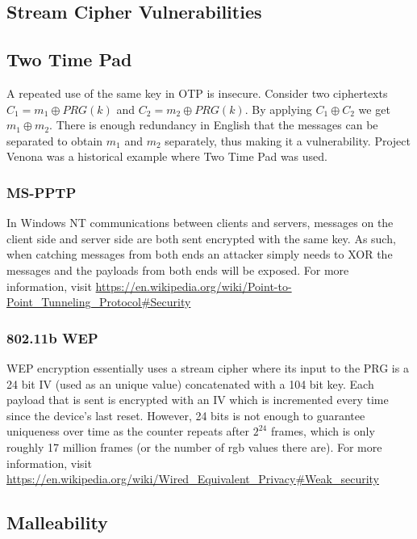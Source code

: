 \documentclass{article}
\begin{document}
\begin{multicols}{2}
\section{Stream Cipher Vulnerabilities}

\subsection{Two Time Pad}

A repeated use of the same key in OTP is insecure. Consider two ciphertexts $C_1 = m_1 \oplus PRG(k)$ and $C_2 = m_2 \oplus PRG(k)$. By applying $C_1 \oplus C_2$ we get $m_1 \oplus m_2$. There is enough redundancy in English that the messages can be separated to obtain $m_1$ and $m_2$ separately, thus making it a vulnerability. Project Venona was a historical example where Two Time Pad was used.

\subsubsection{MS-PPTP}

In Windows NT communications between clients and servers, messages on the client side and server side are both sent encrypted with the same key. As such, when catching messages from both ends an attacker simply needs to XOR the messages and the payloads from both ends will be exposed. For more information, visit \url{https://en.wikipedia.org/wiki/Point-to-Point_Tunneling_Protocol#Security}

\subsubsection{802.11b WEP}

WEP encryption essentially uses a stream cipher where its input to the PRG is a 24 bit IV (used as an unique value) concatenated with a 104 bit key. Each payload that is sent is encrypted with an IV which is incremented every time since the device's last reset. However, 24 bits is not enough to guarantee uniqueness over time as the counter repeats after $2^24$ frames, which is only roughly 17 million frames (or the number of rgb values there are). For more information, visit \url{https://en.wikipedia.org/wiki/Wired_Equivalent_Privacy#Weak_security}

\subsection{Malleability}


\end{multicols}
\end{document}
